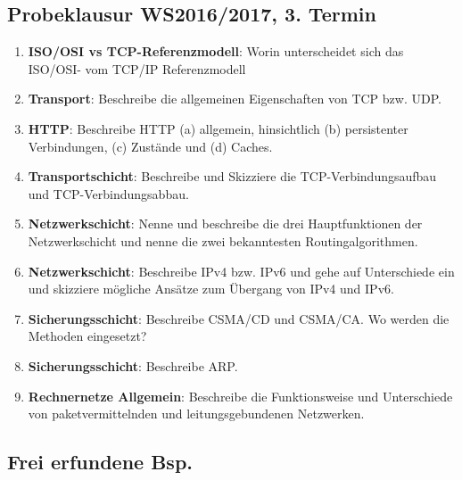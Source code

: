 \documentclass{article}
\begin{document}
    \subsection{Probeklausur WS2016/2017, 3. Termin}
    \begin{enumerate}
        \item \textbf{ISO/OSI vs TCP-Referenzmodell}: Worin unterscheidet sich das ISO/OSI- vom TCP/IP Referenzmodell
        \item \textbf{Transport}: Beschreibe die allgemeinen Eigenschaften von TCP bzw. UDP.
        \item \textbf{HTTP}: Beschreibe HTTP (a) allgemein, hinsichtlich (b) persistenter Verbindungen, (c) Zustände und (d) Caches.
        \item \textbf{Transportschicht}: Beschreibe und Skizziere die TCP-Verbindungsaufbau und TCP-Verbindungsabbau.
        \item \textbf{Netzwerkschicht}:
        Nenne und beschreibe die drei Hauptfunktionen der Netzwerkschicht und nenne die zwei bekanntesten Routingalgorithmen.
        \item \textbf{Netzwerkschicht}: Beschreibe IPv4 bzw. IPv6 und gehe auf Unterschiede ein und skizziere mögliche Ansätze zum Übergang von IPv4 und IPv6.
        \item \textbf{Sicherungsschicht}: Beschreibe CSMA/CD und CSMA/CA. Wo werden die Methoden eingesetzt?
        \item \textbf{Sicherungsschicht}: Beschreibe ARP.
        \item \textbf{Rechnernetze Allgemein}: Beschreibe die Funktionsweise und Unterschiede von paketvermittelnden und leitungsgebundenen Netzwerken.
    \end{enumerate}

    \subsection{Frei erfundene Bsp.}
\end{document}
